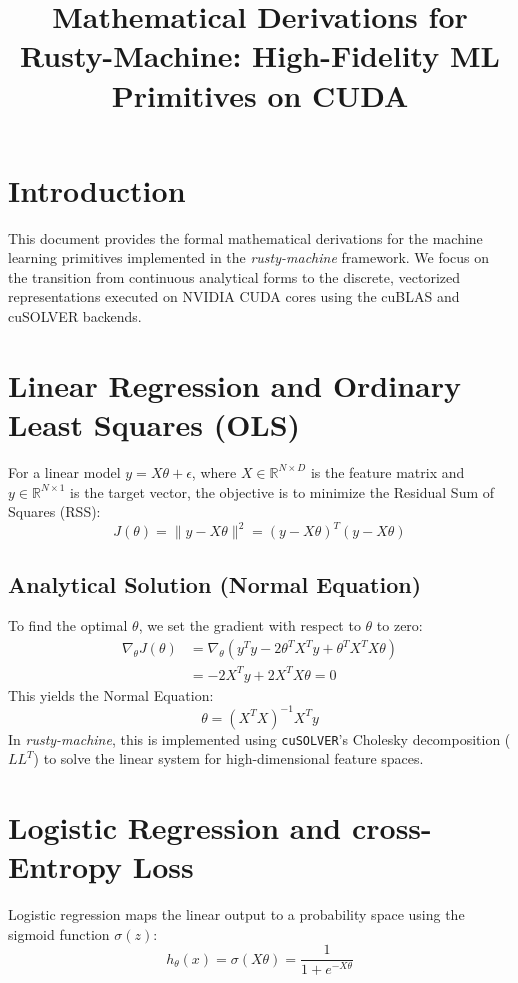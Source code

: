 \documentclass[conference]{IEEEtran}
\title{Mathematical Derivations for Rusty-Machine: High-Fidelity ML Primitives on CUDA}
\author{\IEEEauthorblockN{Technical Appendix}}
\begin{document}
\maketitle

\section{Introduction}
This document provides the formal mathematical derivations for the machine learning primitives implemented in the \textit{rusty-machine} framework. We focus on the transition from continuous analytical forms to the discrete, vectorized representations executed on NVIDIA CUDA cores using the cuBLAS and cuSOLVER backends.

\section{Linear Regression and Ordinary Least Squares (OLS)}
For a linear model $y = X\theta + \epsilon$, where $X \in \mathbb{R}^{N \times D}$ is the feature matrix and $y \in \mathbb{R}^{N \times 1}$ is the target vector, the objective is to minimize the Residual Sum of Squares (RSS):
\begin{equation}
J(\theta) = \|y - X\theta\|^2 = (y - X\theta)^T(y - X\theta)
\end{equation}

\subsection{Analytical Solution (Normal Equation)}
To find the optimal $\theta$, we set the gradient with respect to $\theta$ to zero:
\begin{align}
\nabla_\theta J(\theta) &= \nabla_\theta (y^Ty - 2\theta^TX^Ty + \theta^TX^TX\theta) \\
&= -2X^Ty + 2X^TX\theta = 0
\end{align}
This yields the Normal Equation:
\begin{equation}
\theta = (X^TX)^{-1}X^Ty
\end{equation}
In \textit{rusty-machine}, this is implemented using \texttt{cuSOLVER}'s Cholesky decomposition ($LL^T$) to solve the linear system for high-dimensional feature spaces.

\section{Logistic Regression and cross-Entropy Loss}
Logistic regression maps the linear output to a probability space using the sigmoid function $\sigma(z)$:
\begin{equation}
h_\theta(x) = \sigma(X\theta) = \frac{1}{1 + e^{-X\theta}}
\end{equation}
\end{document}
